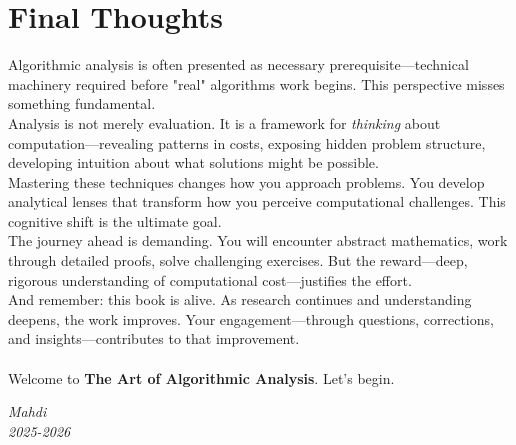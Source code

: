 \section*{Final Thoughts}

Algorithmic analysis is often presented as necessary prerequisite—technical machinery required before "real" algorithms work begins. This perspective misses something fundamental.\\
Analysis is not merely evaluation. It is a framework for \textit{thinking} about computation—revealing patterns in costs, exposing hidden problem structure, developing intuition about what solutions might be possible.\\
Mastering these techniques changes how you approach problems. You develop analytical lenses that transform how you perceive computational challenges. This cognitive shift is the ultimate goal.\\
The journey ahead is demanding. You will encounter abstract mathematics, work through detailed proofs, solve challenging exercises. But the reward—deep, rigorous understanding of computational cost—justifies the effort.\\
And remember: this book is alive. As research continues and understanding deepens, the work improves. Your engagement—through questions, corrections, and insights—contributes to that improvement.\\\\
Welcome to \textbf{The Art of Algorithmic Analysis}. Let's begin.

\vfill{}

\begin{flushright}
	\textit{Mahdi} \\
	\textit{2025-2026} \\
\end{flushright}

\clearpage
